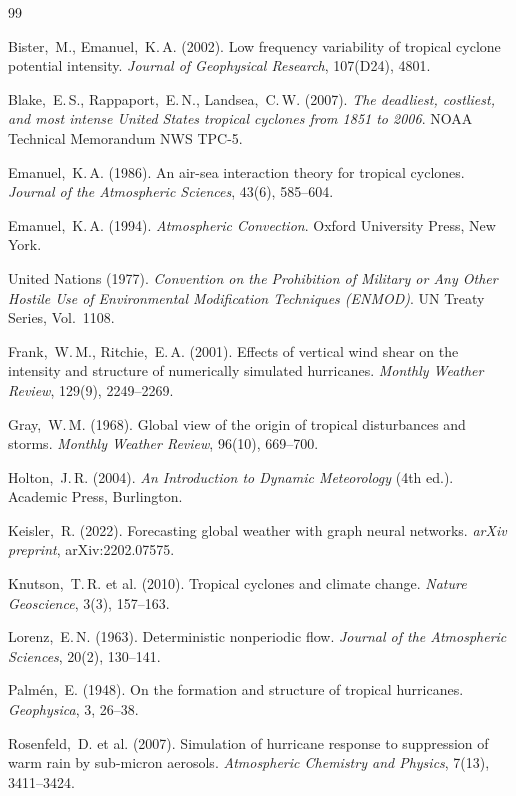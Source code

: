 ﻿\documentclass[a4paper,12pt]{article}
\theoremstyle{definition}
\begin{document}
\begin{thebibliography}{99}

Bister,~M., Emanuel,~K.\,A. (2002).
Low frequency variability of tropical cyclone potential intensity.
\textit{Journal of Geophysical Research}, 107(D24), 4801.

Blake,~E.\,S., Rappaport,~E.\,N., Landsea,~C.\,W. (2007).
\textit{The deadliest, costliest, and most intense United States
tropical cyclones from 1851 to 2006}.
NOAA Technical Memorandum NWS TPC-5.

Emanuel,~K.\,A. (1986).
An air-sea interaction theory for tropical cyclones.
\textit{Journal of the Atmospheric Sciences}, 43(6), 585--604.

Emanuel,~K.\,A. (1994).
\textit{Atmospheric Convection}.
Oxford University Press, New York.

United Nations (1977).
\textit{Convention on the Prohibition of Military or Any Other
Hostile Use of Environmental Modification Techniques (ENMOD)}.
UN Treaty Series, Vol.\ 1108.

Frank,~W.\,M., Ritchie,~E.\,A. (2001).
Effects of vertical wind shear on the intensity and structure
of numerically simulated hurricanes.
\textit{Monthly Weather Review}, 129(9), 2249--2269.

Gray,~W.\,M. (1968).
Global view of the origin of tropical disturbances and storms.
\textit{Monthly Weather Review}, 96(10), 669--700.

Holton,~J.\,R. (2004).
\textit{An Introduction to Dynamic Meteorology} (4th ed.).
Academic Press, Burlington.

Keisler,~R. (2022).
Forecasting global weather with graph neural networks.
\textit{arXiv preprint}, arXiv:2202.07575.

Knutson,~T.\,R. et al. (2010).
Tropical cyclones and climate change.
\textit{Nature Geoscience}, 3(3), 157--163.

Lorenz,~E.\,N. (1963).
Deterministic nonperiodic flow.
\textit{Journal of the Atmospheric Sciences}, 20(2), 130--141.

Palm\'{e}n,~E. (1948).
On the formation and structure of tropical hurricanes.
\textit{Geophysica}, 3, 26--38.

Rosenfeld,~D. et al. (2007).
Simulation of hurricane response to suppression of warm rain
by sub-micron aerosols.
\textit{Atmospheric Chemistry and Physics}, 7(13), 3411--3424.


\end{thebibliography}
\end{document}
